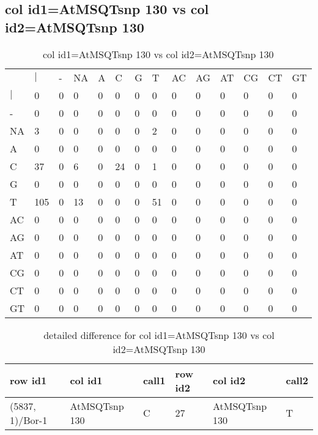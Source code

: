 \subsection{col id1=AtMSQTsnp 130 vs col id2=AtMSQTsnp 130}
\begin{center}
\begin{longtable}{|l|l|l|l|l|l|l|l|l|l|l|l|l|l|}
\caption{col id1=AtMSQTsnp 130 vs col id2=AtMSQTsnp 130} \label{table_dm512}\\
\hline
\\
\hline
&$|$&-&NA&A&C&G&T&AC&AG&AT&CG&CT&GT\\
$|$&0&0&0&0&0&0&0&0&0&0&0&0&0\\
-&0&0&0&0&0&0&0&0&0&0&0&0&0\\
NA&3&0&0&0&0&0&2&0&0&0&0&0&0\\
A&0&0&0&0&0&0&0&0&0&0&0&0&0\\
C&37&0&6&0&24&0&1&0&0&0&0&0&0\\
G&0&0&0&0&0&0&0&0&0&0&0&0&0\\
T&105&0&13&0&0&0&51&0&0&0&0&0&0\\
AC&0&0&0&0&0&0&0&0&0&0&0&0&0\\
AG&0&0&0&0&0&0&0&0&0&0&0&0&0\\
AT&0&0&0&0&0&0&0&0&0&0&0&0&0\\
CG&0&0&0&0&0&0&0&0&0&0&0&0&0\\
CT&0&0&0&0&0&0&0&0&0&0&0&0&0\\
GT&0&0&0&0&0&0&0&0&0&0&0&0&0\\
\hline
\end{longtable}
\end{center}

\begin{center}
\begin{longtable}{|l|l|l|l|l|l|}
\caption{detailed difference for col id1=AtMSQTsnp 130 vs col id2=AtMSQTsnp 130} \label{table_dm513}\\
\hline
row id1&col id1&call1&row id2&col id2&call2\\
\hline
(5837, 1)/Bor-1&AtMSQTsnp 130&C&27&AtMSQTsnp 130&T\\
\hline
\end{longtable}
\end{center}

